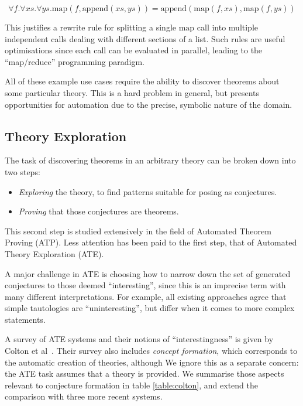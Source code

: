 \begin{equation} \label{eq:mapreduce}
  \forall f. \forall xs. \forall ys. \text{map}(f, \text{append}(xs, ys)) = \text{append}(\text{map}(f, xs), \text{map}(f, ys))
\end{equation}

This justifies a rewrite rule for splitting a single $\text{map}$ call into
multiple independent calls dealing with different sections of a list. Such rules
are useful optimisations since each call can be evaluated in parallel, leading
to the ``map/reduce'' programming paradigm.

All of these example use cases require the ability to discover theorems about
some particular theory. This is a hard problem in general, but presents
opportunities for automation due to the precise, symbolic nature of the domain.

\subsection{Theory Exploration}
\label{sec:te}

The task of discovering theorems in an arbitrary theory can be broken down into
two steps:

\begin{itemize}
\item \emph{Exploring} the theory, to find patterns suitable for posing as
  conjectures.
\item \emph{Proving} that those conjectures are theorems.
\end{itemize}

This second step is studied extensively in the field of Automated Theorem
Proving (ATP). Less attention has been paid to the first step, that of
Automated Theory Exploration (ATE).

A major challenge in ATE is choosing how to narrow down the set of generated
conjectures to those deemed ``interesting'', since this is an imprecise term
with many different interpretations. For example, all existing approaches agree
that simple tautologies are ``uninteresting'', but differ when it comes to more
complex statements.

A survey of ATE systems and their notions of ``interestingness'' is given by
Colton et al~\cite{colton2000notion}. Their survey also includes \emph{concept
  formation}, which corresponds to the automatic creation of theories, although
We ignore this as a separate concern: the ATE task assumes that a theory is
provided. We summarise those aspects relevant to conjecture formation in table
\ref{table:colton}, and extend the comparison with three more recent systems.

